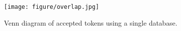 \begin{figure}[ht]
\centering
\texttt{[image: figure/overlap.jpg]}
\vspace{-.8em}
\caption{\small Venn diagram of accepted tokens using a single database.}
\label{fig:token_coverage}
\vspace{-.5em}
\end{figure}